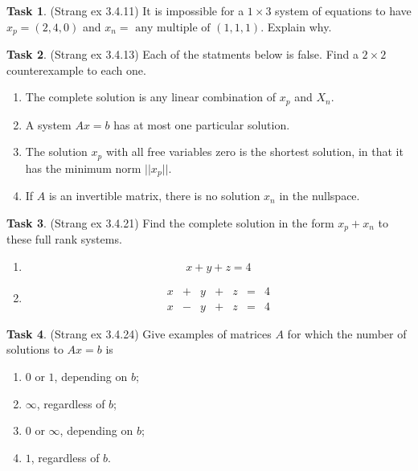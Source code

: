 \documentclass[10pt,]{book}
\theoremstyle{plain}
\theoremstyle{definition}
\numberwithin{equation}{section}
\newtheorem{task}{Task}[chapter]
\begin{document}
\begin{task}
\label{task-102}
(Strang ex 3.4.11)
        It is impossible for a \(1 \times 3\) system of equations to have
        \(x_p = (2,4,0)\) and \(x_n = \text{ any multiple of } (1,1,1)\).
        Explain why.
      \end{task}
\begin{task}
\label{task-103}
(Strang ex 3.4.13)
        Each of the statments below is false. Find a \(2\times 2\) counterexample
        to each one.
        \begin{enumerate}
\item{}
            The complete solution is any linear combination of \(x_p\) and
            \(X_n\).
          \item{}
            A system \(Ax=b\) has at most one particular solution.
          \item{}
            The solution \(x_p\) with all free variables zero is the shortest
            solution, in that it has the minimum norm \(||x_p||\).
          \item{}
            If \(A\) is an invertible matrix, there is no solution \(x_n\)
            in the nullspace.
          \end{enumerate}
\end{task}
\begin{task}
\label{task-104}
(Strang ex 3.4.21)
        Find the complete solution in the form \(x_p + x_n\) to these full
        rank systems.
        \begin{enumerate}
\item{}
            \[ x+y+z = 4\]
          \item{}
            \[
              \begin{array}{ccccccc}
              x & + & y & + & z & = & 4 \\
              x & - & y & + & z & = & 4
              \end{array}
            \]
          \end{enumerate}
\end{task}
\begin{task}
\label{task-105}
(Strang ex 3.4.24)
        Give examples of matrices \(A\) for which the number of solutions
        to \(Ax = b\) is
        \begin{enumerate}
\item{}\(0\) or \(1\), depending on \(b\);\item{}\(\infty\), regardless of \(b\);\item{}\(0\) or \(\infty\), depending on \(b\);\item{}\(1\), regardless of \(b\).\end{enumerate}
\end{task}
\end{document}
